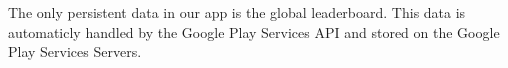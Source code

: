 The only persistent data in our app is the global leaderboard. This data is automaticly handled by the Google Play Services API and stored on the Google Play Services Servers. 
